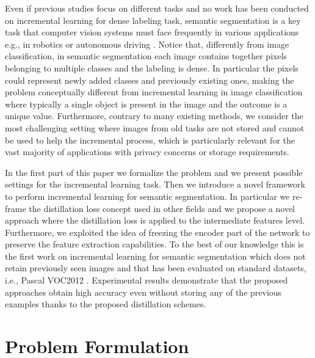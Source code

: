 \documentclass[10pt,twocolumn,letterpaper]{article}
\begin{document}
Even if previous studies focus on different tasks and no work has been conducted on incremental learning for dense labeling task, semantic segmentation is a key task that computer vision systems must face frequently in various applications e.g., in robotics or autonomous driving \cite{biasetton2019unsupervised,michieli2018game}.
Notice that, differently from image classification, in semantic segmentation each image contains together pixels belonging to multiple classes and the labeling is dense. In particular the pixels could represent newly added classes and previously existing ones, making the problem conceptually different from incremental learning in image classification where typically a single object is present in the image and the outcome is a unique value.
Furthermore, contrary to many existing methods, we consider the most challenging setting where images from old tasks are not stored and cannot be used to help the incremental process, which is particularly relevant for the vast majority of applications with privacy concerns or storage requirements.

In the first part of this paper we formalize the problem and we present possible settings for the incremental learning task.
Then we introduce a novel framework to perform incremental learning for semantic segmentation. 
In particular we re-frame the distillation loss concept used in other fields and we propose a novel approach where the distillation loss is applied to the intermediate features level. Furthermore, we exploited the idea of freezing the encoder part of the network to preserve the feature extraction capabilities.
 To the best of our knowledge this is the first work on incremental learning for semantic segmentation which does not retain previously seen images and that has been evaluated on standard datasets, i.e., Pascal VOC2012 \cite{pascalvoc2012}.
Experimental results demonstrate that the proposed approaches obtain high accuracy even without storing any of the previous examples thanks to the proposed distillation schemes. 

 \section{Problem Formulation} \label{sec:problem}
\end{document}
